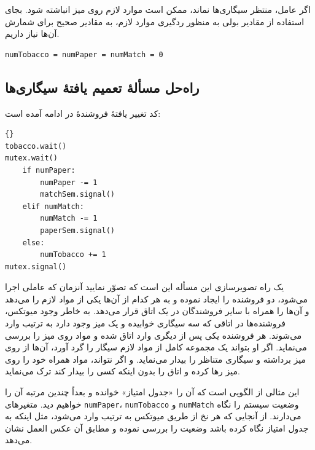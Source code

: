 \documentclass{book}
\newcommand{\clearemptydoublepage}{\newpage\cleardoublepage}
\begin{document}
    اگر عامل، منتظر سیگاری‌ها نماند، ممکن است موارد لازم روی میز انباشته شود. بجای استفاده از مقادیر بولی به منظور ردگیری موارد لازم، 
    به مقادیر صحیح برای شمارش آن‌ها نیاز داریم. 

\begin{latin}
\begin{lstlisting}[title=\rl{راهنمای  مسألهٔ تعمیم یافتهٔ سیگاری‌ها}]
numTobacco = numPaper = numMatch = 0
\end{lstlisting}
\end{latin}


\clearemptydoublepage
\subsection{راه‌حل مسألهٔ تعمیم یافتهٔ سیگاری‌ها}
\label{smoker}

    کد تغییر یافتهٔ فروشندهٔ  در ادامه آمده است: 

\begin{latin}
\begin{lstlisting}[title={\rl{فروشنده} A}]{}
tobacco.wait()
mutex.wait()
    if numPaper:
        numPaper -= 1
        matchSem.signal()
    elif numMatch:
        numMatch -= 1
        paperSem.signal()
    else: 
        numTobacco += 1
mutex.signal()
\end{lstlisting}
\end{latin}

    یک راه تصویرسازی این مسأله این است که تصوّر نمایید آنزمان که عاملی اجرا می‌شود‌، دو فروشنده را ایجاد نموده و به هر کدام از آن‌ها یکی از مواد لازم را 
    می‌دهد و آن‌ها را همراه با سایر فروشندگان در یک اتاق قرار می‌دهد. به خاطر وجود میوتکس، فروشنده‌ها در اتاقی که سه سیگاری خوابیده و یک میز وجود دارد 
    به ترتیب وارد می‌شوند. هر فروشنده یکی پس از دیگری وارد اتاق شده و مواد روی میز را بررسی می‌نماید. اگر او بتواند یک مجموعه کامل از مواد لازم سیگار را
    گرد آورد، آن‌ها از روی میز برداشته و سیگاری متناظر را بیدار می‌نماید. و اگر نتواند،‌ مواد همراه خود را روی میز رها کرده و اتاق را بدون اینکه کسی را 
    بیدار کند ترک می‌نماید. 

    این مثالی از الگویی است که آن را «جدول امتیاز» خوانده و بعداً چندین مرتبه آن را خواهیم دید.   
    متغیرهای     {\tt numPaper}، {\tt numTobacco} و  {\tt numMatch}    وضعیت سیستم را نگاه می‌دارند. 
    از آنجایی که هر نخ از طریق میوتکس به ترتیب وارد می‌شود، مثل اینکه به جدول امتیاز نگاه کرده باشد وضعیت را بررسی نموده و مطابق آن عکس العمل نشان می‌دهد. 


\end{document}
